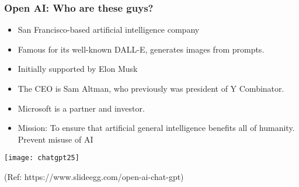 




\begin{frame}[fragile]\frametitle{Open AI: Who are these guys?}


\begin{itemize}
\item San Francisco-based artificial intelligence company
\item Famous for its well-known DALL-E, generates images from prompts.
\item Initially supported by Elon Musk
\item The CEO is Sam Altman, who previously was president of Y Combinator.
\item Microsoft is a partner and investor.
\item Mission: To ensure that artificial general intelligence benefits all of humanity. Prevent misuse of AI
\end{itemize}	 

\begin{center}
\texttt{[image: chatgpt25]}
\end{center}				
{\tiny (Ref: https://www.slideegg.com/open-ai-chat-gpt)}


\end{frame}






